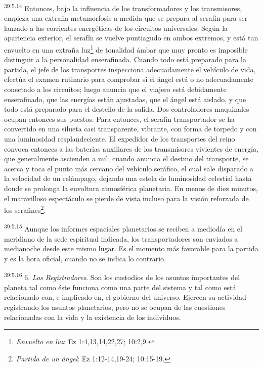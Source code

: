 \par
\textsuperscript{39:5.14} Entonces, bajo la influencia de los transformadores y los transmisores, empieza una extraña metamorfosis a medida que se prepara al serafín para ser lanzado a las corrientes energéticas de los circuitos universales. Según la apariencia exterior, el serafín se vuelve puntiagudo en ambos extremos, y está tan envuelto en una extraña luz\footnote{\textit{Envuelto en luz}: Ez 1:4,13,14,22,27; 10:2,9.} de tonalidad ámbar que muy pronto es imposible distinguir a la personalidad enserafinada. Cuando todo está preparado para la partida, el jefe de los transportes inspecciona adecuadamente el vehículo de vida, efectúa el examen rutinario para comprobar si el ángel está o no adecuadamente conectado a los circuitos; luego anuncia que el viajero está debidamente enserafinado, que las energías están ajustadas, que el ángel está aislado, y que todo está preparado para el destello de la salida. Dos controladores maquinales ocupan entonces sus puestos. Para entonces, el serafín transportador se ha convertido en una silueta casi transparente, vibrante, con forma de torpedo y con una luminosidad resplandeciente. El expedidor de los transportes del reino convoca entonces a las baterías auxiliares de los transmisores vivientes de energía, que generalmente ascienden a mil; cuando anuncia el destino del transporte, se acerca y toca el punto más cercano del vehículo seráfico, el cual sale disparado a la velocidad de un relámpago, dejando una estela de luminosidad celestial hasta donde se prolonga la envoltura atmosférica planetaria. En menos de diez minutos, el maravilloso espectáculo se pierde de vista incluso para la visión reforzada de los serafines\footnote{\textit{Partida de un ángel}: Ez 1:12-14,19-24; 10:15-19.}.

\par
\textsuperscript{39:5.15} Aunque los informes espaciales planetarios se reciben a mediodía en el meridiano de la sede espiritual indicada, los transportadores son enviados a medianoche desde este mismo lugar. Es el momento más favorable para la partida y es la hora oficial, cuando no se indica lo contrario.

\par
\textsuperscript{39:5.16} 6. \textit{Los Registradores}. Son los custodios de los asuntos importantes del planeta tal como éste funciona como una parte del sistema y tal como está relacionado con, e implicado en, el gobierno del universo. Ejercen su actividad registrando los asuntos planetarios, pero no se ocupan de las cuestiones relacionadas con la vida y la existencia de los individuos.

